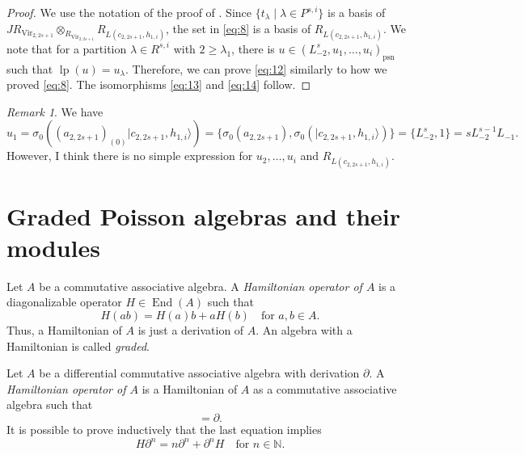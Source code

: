 \documentclass[a4paper, 12pt, reqno]{amsart}
\theoremstyle{remark}
\newtheorem{remark}[theorem]{Remark}
\DeclareMathOperator{\Vir}{Vir}
\DeclareMathOperator{\lp}{lp}
\DeclareMathOperator{\End}{End}
\DeclareMathOperator{\psn}{psn}
\begin{document}
\begin{proof}
  We use the notation of the proof of .
  Since $\{t_{\lambda} \mid \lambda \in P^{s, i}\}$ is a basis of $JR_{\Vir_{2, 2s + 1}} \otimes_{R_{\Vir_{2, 2s + 1}}} R_{L(c_{2, 2s + 1}, h_{1, i})}$, the set in \eqref{eq:8} is a basis of $R_{L(c_{2, 2s + 1}, h_{1, i})}$.
  We note that for a partition $\lambda \in R^{s, i}$ with $2 \ge \lambda_1$, there is $u \in (L_{-2}^s, u_1, \dots, u_i)_{\psn}$ such that $\lp(u) = u_{\lambda}$.
  Therefore, we can prove \eqref{eq:12} similarly to how we proved \eqref{eq:8}.
  The isomorphisms \eqref{eq:13} and \eqref{eq:14} follow.
\end{proof}

\begin{remark}
  \label{rmk:6}
  We have
  \begin{equation*}
    u_1 = \sigma_0((a_{2, 2s + 1})_{(0)}|c_{2, 2s + 1}, h_{1, i}\rangle) = \{\sigma_0(a_{2, 2s + 1}), \sigma_0(|c_{2, 2s + 1}, h_{1, i}\rangle)\} = \{L_{-2}^s, 1\} = sL_{-2}^{s - 1}L_{-1}.
  \end{equation*}
  However, I think there is no simple expression for $u_2, \dots, u_i$ and $R_{L(c_{2, 2s + 1}, h_{1, i})}$.
\end{remark}

\appendix
\section{Graded Poisson algebras and their modules}
\label{sec:grad-poiss-algeb}

Let $A$ be a commutative associative algebra.
A \emph{Hamiltonian operator of $A$} is a diagonalizable operator $H \in \End(A)$ such that
\begin{equation*}
  H(ab) = H(a)b + aH(b) \quad \text{for $a, b \in A$}.
\end{equation*}
Thus, a Hamiltonian of $A$ is just a derivation of $A$.
An algebra with a Hamiltonian is called \emph{graded}.

Let $A$ be a differential commutative associative algebra with derivation $\partial$.
A \emph{Hamiltonian operator of $A$} is a Hamiltonian of $A$ as a commutative associative algebra such that
\begin{equation*}
  [H, \partial] = \partial.
\end{equation*}
It is possible to prove inductively that the last equation implies
\begin{equation}
  \label{eq:15}
  H\partial^n = n\partial^n + \partial^nH \quad \text{for $n \in \mathbb{N}$}.
\end{equation}
\end{document}
